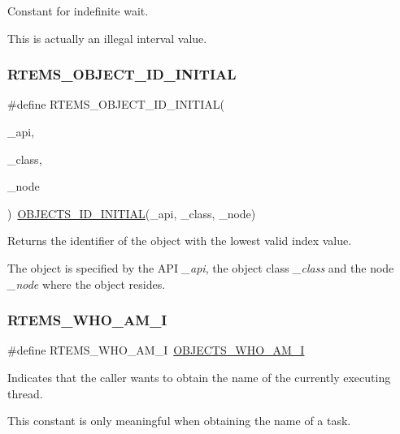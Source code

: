 Constant for indefinite wait. 

This is actually an illegal interval value. \mbox{\label{group__RTEMSAPIClassic_ga381ee834c91f1ccd830f58a472aeffa6}} 
\subsubsection{\texorpdfstring{RTEMS\_OBJECT\_ID\_INITIAL}{RTEMS\_OBJECT\_ID\_INITIAL}}
{\footnotesize\ttfamily \#define R\+T\+E\+M\+S\+\_\+\+O\+B\+J\+E\+C\+T\+\_\+\+I\+D\+\_\+\+I\+N\+I\+T\+I\+AL(\begin{DoxyParamCaption}\item[{}]{\+\_\+api,  }\item[{}]{\+\_\+class,  }\item[{}]{\+\_\+node }\end{DoxyParamCaption})~\mbox{\hyperlink{group__RTEMSScoreObject_ga7ad5e19b6b3d77541c5c272188a71fbe}{O\+B\+J\+E\+C\+T\+S\+\_\+\+I\+D\+\_\+\+I\+N\+I\+T\+I\+AL}}(\+\_\+api, \+\_\+class, \+\_\+node)}



Returns the identifier of the object with the lowest valid index value. 

The object is specified by the A\+PI {\itshape \+\_\+api}, the object class {\itshape \+\_\+class} and the node {\itshape \+\_\+node} where the object resides. \mbox{\label{group__RTEMSAPIClassic_gaf2074f5738d942a95bc7c61658be80e4}} 
\subsubsection{\texorpdfstring{RTEMS\_WHO\_AM\_I}{RTEMS\_WHO\_AM\_I}}
{\footnotesize\ttfamily \#define R\+T\+E\+M\+S\+\_\+\+W\+H\+O\+\_\+\+A\+M\+\_\+I~\mbox{\hyperlink{group__RTEMSScoreObject_ga6fd7ff36e6d951ff7cf435e9a7cdf359}{O\+B\+J\+E\+C\+T\+S\+\_\+\+W\+H\+O\+\_\+\+A\+M\+\_\+I}}}



Indicates that the caller wants to obtain the name of the currently executing thread. 

This constant is only meaningful when obtaining the name of a task. 